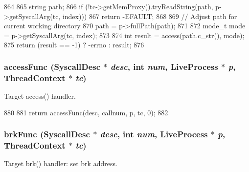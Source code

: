 \begin{DoxyCode}
864 {
865     string path;
866     if (!tc->getMemProxy().tryReadString(path, p->getSyscallArg(tc, index)))
867         return -EFAULT;
868 
869     // Adjust path for current working directory
870     path = p->fullPath(path);
871 
872     mode_t mode = p->getSyscallArg(tc, index);
873 
874     int result = access(path.c_str(), mode);
875     return (result == -1) ? -errno : result;
876 }
\end{DoxyCode}
\hypertarget{syscall__emul_8hh_a3a57f406428b5272824549aecc218cff}{
\subsubsection[{accessFunc}]{ accessFunc ({\bf SyscallDesc} $\ast$ {\em desc}, \/  int {\em num}, \/  {\bf LiveProcess} $\ast$ {\em p}, \/  {\bf ThreadContext} $\ast$ {\em tc})}}
\label{syscall__emul_8hh_a3a57f406428b5272824549aecc218cff}


Target access() handler. 


\begin{DoxyCode}
880 {
881     return accessFunc(desc, callnum, p, tc, 0);
882 }
\end{DoxyCode}
\hypertarget{syscall__emul_8hh_aacb64b1e0489626a0c931f076d2f4f31}{
\subsubsection[{brkFunc}]{ brkFunc ({\bf SyscallDesc} $\ast$ {\em desc}, \/  int {\em num}, \/  {\bf LiveProcess} $\ast$ {\em p}, \/  {\bf ThreadContext} $\ast$ {\em tc})}}
\label{syscall__emul_8hh_aacb64b1e0489626a0c931f076d2f4f31}


Target brk() handler: set brk address. 


